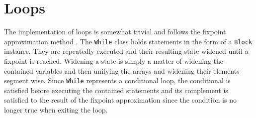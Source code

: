 

\section{Loops}

The implementation of loops is somewhat trivial and follows the fixpoint approximation method \cite{cousot1977}. The \texttt{While} class holds statements in the form of a \texttt{Block} instance. They are repeatedly executed and their resulting state widened until a fixpoint is reached. Widening a state is simply a matter of widening the contained variables and then unifying the arrays and widening their elements segment wise. Since \texttt{While} represents a conditional loop, the conditional is satisfied before executing the contained statements and its complement is satisfied to the result of the fixpoint approximation since the condition is no longer true when exiting the loop.

















